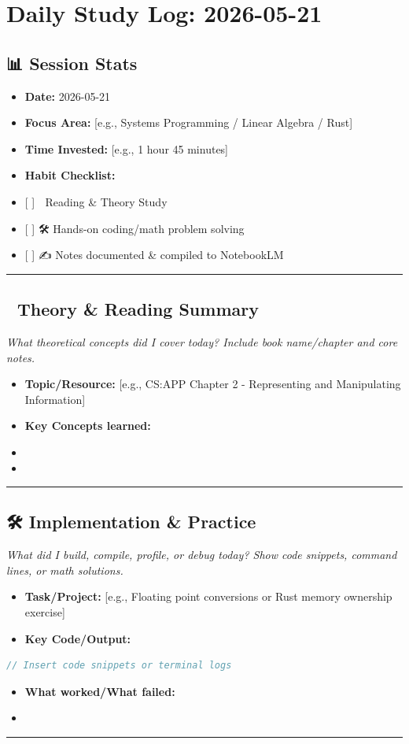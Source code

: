 \section{Daily Study Log: 2026-05-21}

\subsection{📊 Session Stats}
\begin{itemize}
  \item \textbf{Date:} 2026-05-21
  \item \textbf{Focus Area:} [e.g., Systems Programming / Linear Algebra / Rust]
  \item \textbf{Time Invested:} [e.g., 1 hour 45 minutes]
  \item \textbf{Habit Checklist:}
  \item {[ ]} 📖 Reading \& Theory Study
  \item {[ ]} 🛠️ Hands-on coding/math problem solving
  \item {[ ]} ✍️ Notes documented \& compiled to NotebookLM

\end{itemize}
\noindent\rule{\textwidth}{0.4pt}

\subsection{📖 Theory \& Reading Summary}
\textit{What theoretical concepts did I cover today? Include book name/chapter and core notes.}

\begin{itemize}
  \item \textbf{Topic/Resource:} [e.g., CS:APP Chapter 2 - Representing and Manipulating Information]
  \item \textbf{Key Concepts learned:}
  \item 
  \item 

\end{itemize}
\noindent\rule{\textwidth}{0.4pt}

\subsection{🛠️ Implementation \& Practice}
\textit{What did I build, compile, profile, or debug today? Show code snippets, command lines, or math solutions.}

\begin{itemize}
  \item \textbf{Task/Project:} [e.g., Floating point conversions or Rust memory ownership exercise]
  \item \textbf{Key Code/Output:}
\end{itemize}
\begin{lstlisting}[language=Rust]
  // Insert code snippets or terminal logs
\end{lstlisting}
\begin{itemize}
  \item \textbf{What worked/What failed:}
  \item 

\end{itemize}
\noindent\rule{\textwidth}{0.4pt}


